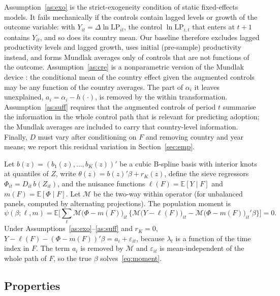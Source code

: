 \documentclass[pdflatex,sn-basic]{sn-jnl}%
\theoremstyle{thmstyleone}
\theoremstyle{thmstyletwo}
\newcommand{\E}{\mathbb{E}}
\newcommand{\M}{\mathcal{M}}
\begin{document}
Assumption~\ref{as:exo} is the strict-exogeneity condition of static fixed-effects models. It fails mechanically if the controls contain lagged levels or growth of the outcome variable: with $Y_{it}=\Delta\ln \mathrm{LP}_{it}$, the control $\ln \mathrm{LP}_{i,t}$ that enters at $t+1$ contains $Y_{it}$, and so does its country mean. Our baseline therefore excludes lagged productivity levels and lagged growth, uses initial (pre-sample) productivity instead, and forms Mundlak averages only of controls that are not functions of the outcome. Assumption~\ref{as:cre} is a nonparametric version of the Mundlak device \citep{mundlak1978,wooldridge2010}: the conditional mean of the country effect given the augmented controls may be any function of the country averages. The part of $\alpha_i$ it leaves unexplained, $a_i=\alpha_i-h(\cdot)$, is removed by the within transformation. Assumption~\ref{as:suff} requires that the augmented controls of period $t$ summarise the information in the whole control path that is relevant for predicting adoption; the Mundlak averages are included to carry that country-level information. Finally, $D$ must vary after conditioning on $F$ and removing country and year means; we report this residual variation in Section~\ref{sec:emp}.

Let $b(z)=(b_1(z),\dots,b_K(z))'$ be a cubic B-spline basis with interior knots at quantiles of $Z$, write $\theta(z)=b(z)'\beta+r_K(z)$, define the sieve regressors $\Phi_{it}=D_{it}\,b(Z_{it})$, and the nuisance functions $\ell(F)=\E[Y\mid F]$ and $m(F)=\E[\Phi\mid F]$. Let $\M$ be the two-way within operator (for unbalanced panels, computed by alternating projections). The population moment is
\begin{equation}
\psi(\beta;\ell,m)=\E\Big[\sum_t \M\big(\Phi-m(F)\big)_{it}\,\Big\{\M\big(Y-\ell(F)\big)_{it}-\M\big(\Phi-m(F)\big)_{it}'\beta\Big\}\Big]=0 .
\label{eq:moment}
\end{equation}
Under Assumptions~\ref{as:exo}--\ref{as:suff} and $r_K=0$, $Y-\ell(F)-(\Phi-m(F))'\beta=a_i+\varepsilon_{it}$, because $\lambda_t$ is a function of the time index in $F$. The term $a_i$ is removed by $\M$ and $\varepsilon_{it}$ is mean-independent of the whole path of $F$, so the true $\beta$ solves~\eqref{eq:moment}.

\subsection{Properties}
\end{document}
